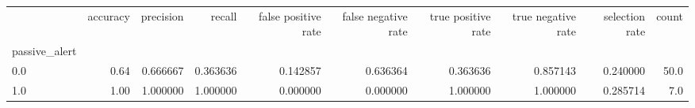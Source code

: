 \begin{tabular}{lrrrrrrrrr}
\toprule
{} &  accuracy &  precision &    recall &  false positive rate &  false negative rate &  true positive rate &  true negative rate &  selection rate &  count \\
passive\_alert &           &            &           &                      &                      &                     &                     &                 &        \\
\midrule
0.0           &      0.64 &   0.666667 &  0.363636 &             0.142857 &             0.636364 &            0.363636 &            0.857143 &        0.240000 &   50.0 \\
1.0           &      1.00 &   1.000000 &  1.000000 &             0.000000 &             0.000000 &            1.000000 &            1.000000 &        0.285714 &    7.0 \\
\bottomrule
\end{tabular}
